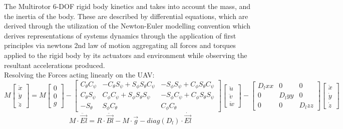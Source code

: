 \documentclass[12pt,a4paper,twoside]{report}
\begin{document}
				The Multirotor 6-DOF rigid body kinetics and takes into account the mass, and the inertia of the body. These are described by differential equations, which are derived through the utilization of the Newton-Euler modelling convention which derives representations of systems dynamics through the application of first principles via newtons 2nd law of motion aggregating all forces and torques applied to the rigid body by its actuators and environment while observing the resultant accelerations produced.
				\\
				Resolving the Forces acting linearly on the UAV:
				\\
				\begin{equation}
				M 
				\begin{bmatrix}
					\ddot{x} \\
					\ddot{y} \\
					\ddot{z}
				\end{bmatrix}
				=
				M 
				\begin{bmatrix}
					0 \\
					0 \\
					g
				\end{bmatrix}
				-
				\begin{bmatrix}
					C_\theta C_\psi & -C_\theta S_\psi + S_\phi S_\theta C_\psi & -S_\phi S_\psi + C_\phi S_\theta C_\psi \\
					C_\theta S_\psi &  C_\phi C_\psi + S_\phi S_\theta S_\psi   & -S_\phi C_\psi + C_\phi S_\theta S_\psi \\
					-S_\theta       &  S_\phi C_\theta                          &  C_\phi C_\theta
				\end{bmatrix}
				\begin{bmatrix}
					\ddot{u} \\
					\ddot{v} \\
					\ddot{w} 
				\end{bmatrix}
				-
				\begin{bmatrix}
					D_lxx & 0 & 0 \\
					0 & D_lyy & 0 \\
					0 & 0 & D_lzz
				\end{bmatrix}
				\begin{bmatrix}
					\dot{x} \\
					\dot{y} \\
					\dot{z} 
				\end{bmatrix}
				\end{equation}  
				\[ M \cdot \ddot{\vec{El}} = R \cdot \ddot{\vec{Bl}} - M \cdot \vec{g} - diag(D_l) \cdot \dot{\vec{El}}\] 
\end{document}
